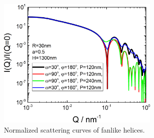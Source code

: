 \begin{figure}[htb]
\begin{center}
\includegraphics[width=0.7\textwidth]{../images/form_factor/cylindrical_obj/helix_fanlike_IQ.png}
\end{center}
\caption{Normalized scattering curves of fanlike helices.}
\label{fig:helixfanlikeIQ}
\end{figure}

\newpage
